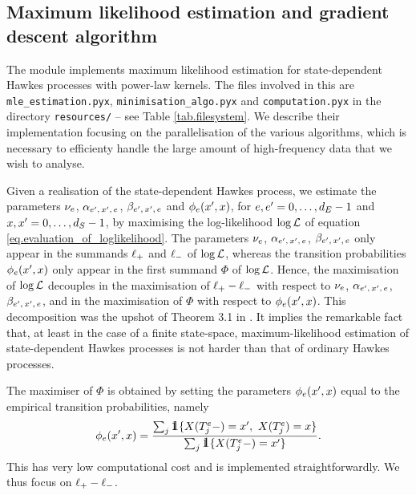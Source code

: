 \documentclass[10pt, article,table]{article}
\begin{document}
\subsection{Maximum likelihood estimation and gradient descent algorithm}
The module implements maximum likelihood estimation for state-dependent Hawkes processes with power-law kernels. The files involved in this are \texttt{mle\_estimation.pyx}, \texttt{minimisation\_algo.pyx} and \texttt{computation.pyx} in the directory \texttt{resources/} -- see Table \ref{tab.filesystem}. We describe their implementation focusing on the parallelisation of the various algorithms, which is necessary to efficienty handle the large amount of high-frequency data that we wish to analyse. 

Given a realisation of the state-dependent Hawkes process, we estimate the parameters $\nu_e$, $\alpha_{e^{\prime},\, x^{\prime},\, e}$, $\beta_{e^{\prime},\, x^{\prime},\, e}$ and $\phi_e(x^{\prime},x)$, for $e, e^{\prime} =0,\dots,d_{E}-1$ and $x, x^{\prime} = 0,\dots, d_{S} -1$, by maximising the log-likelihood $\log \mathcal{L}$ of equation \eqref{eq.evaluation_of_loglikelihood}. The parameters $\nu_e$, $\alpha_{e^{\prime},\, x^{\prime},\, e}$, $\beta_{e^{\prime},\, x^{\prime},\, e}$ only appear in the summands $\ell_{+}$ and $\ell_{-}$ of $\log \mathcal{L}$, whereas the transition probabilities $\phi_e(x^{\prime},x)$ only appear in the first summand $\Phi$ of $\log \mathcal{L}$. Hence, the maximisation of $\log \mathcal{L}$ decouples in the maximisation of $\ell_{+}-\ell_{-}$ with respect to $\nu_e$, $\alpha_{e^{\prime},\, x^{\prime},\, e}$, $\beta_{e^{\prime},\, x^{\prime},\, e}$, and in the maximisation of $\Phi$ with respect to $\phi_e(x^{\prime},x)$. This decomposition was the upshot of Theorem 3.1 in \citealp{MP18sta}. It  implies the remarkable fact that, at least in the case of a finite state-space, maximum-likelihood estimation of state-dependent Hawkes processes is not harder than that of ordinary Hawkes processes.  

The maximiser of $\Phi$ is obtained by setting the parameters $\phi_e(x^{\prime},x)$ equal to the empirical transition probabilities, namely
\begin{equation*}
  \transProb_{e}(\xone,x) = 
  \frac{\sum_j \one\lbrace\stateVariable(\arrivalTimes[e]_j - )=\xone, \, \, \stateVariable(\arrivalTimes[e]_j )=x \rbrace} {\sum_j \one\lbrace\stateVariable(\arrivalTimes[e]_j - )=\xone \rbrace}.
\end{equation*}
This has very low computational cost and is implemented straightforwardly. We thus focus on $\ell_{+}-\ell_{-}$.
\end{document}
